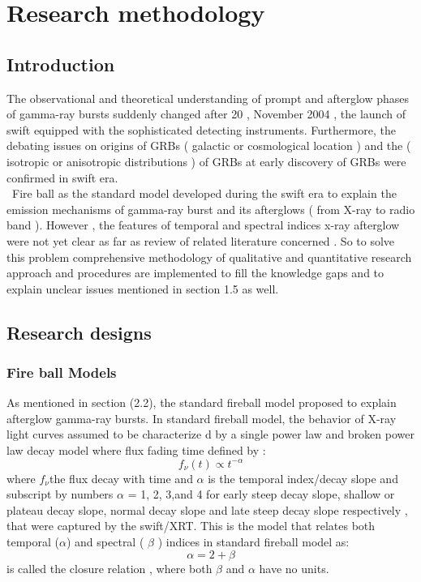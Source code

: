 \setcounter{chapter}{2}
\chapter{Research methodology}
\label{chap:3}
\section{Introduction}
The observational and  theoretical understanding of  prompt and  afterglow  phases  of gamma-ray  bursts  suddenly  changed after  20 , November 2004 , the launch of swift equipped with the sophisticated detecting  instruments. Furthermore, the debating  issues  on origins of GRBs ( galactic or cosmological location ) and  the  ( isotropic  or  anisotropic  distributions )  of  GRBs at early  discovery of GRBs  were  confirmed  in  swift era. \\\
Fire ball as  the standard  model   developed  during the  swift era  to  explain  the  emission  mechanisms  of  gamma-ray burst and its  afterglows ( from X-ray to radio  band ). However , the features  of temporal  and  spectral  indices  x-ray afterglow  were not yet clear  as  far  as   review  of  related  literature  concerned . So to solve  this  problem   comprehensive  methodology of  qualitative  and  quantitative research  approach  and  procedures  are  implemented  to  fill the  knowledge  gaps  and  to  explain  unclear  issues  mentioned  in section 1.5 as well.   
\section{Research designs}
\subsection{Fire ball Models}
As  mentioned  in  section (2.2), the  standard   fireball model  proposed   to  explain afterglow   gamma-ray   bursts. In   standard    fireball  model, the   behavior of   X-ray   light curves   assumed  to  be  characterize d   by   a single power   law  and   broken   power   law   decay    model    where flux   fading  time  defined   by : 
\begin{equation}
f_{\nu}(t)\propto  t^{-\alpha} 
\end{equation}
where  $f_{\nu} $the flux decay with time and  $ \alpha  $ is the temporal index/decay slope and subscript by numbers  $ \alpha $ = 1, 2, 3,and 4 for early steep decay slope, shallow or plateau  decay  slope, normal  decay  slope and late  steep  decay slope respectively , that were captured by the swift/XRT. This  is the model that relates both temporal ($ \alpha $) and spectral ( $ \beta $ ) indices  in standard fireball model as:
\begin{equation}
 \alpha  = 2 +   \beta   
\end{equation} is  called the closure relation , where   both  $\beta $  and  $ \alpha $  have  no  units.\\
